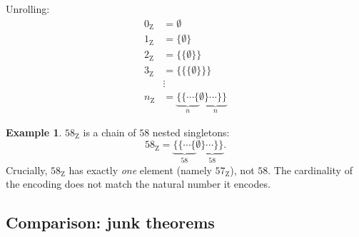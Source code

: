 \documentclass[12pt]{article}
\theoremstyle{definition}
\newtheorem{example}[theorem]{Example}
\theoremstyle{remark}
\begin{document}
Unrolling:
\begin{align*}
0_{\mathrm{Z}} &= \emptyset \\
1_{\mathrm{Z}} &= \{\emptyset\} \\
2_{\mathrm{Z}} &= \{\{\emptyset\}\} \\
3_{\mathrm{Z}} &= \{\{\{\emptyset\}\}\} \\
&\vdots \\
n_{\mathrm{Z}} &= \underbrace{\{\{\cdots\{}_{n}\emptyset\underbrace{\}\cdots\}\}}_{n}
\end{align*}

\begin{example}
$58_{\mathrm{Z}}$ is a chain of $58$ nested singletons:
\begin{equation}
58_{\mathrm{Z}} = \underbrace{\{\{\cdots\{}_{58}\emptyset\underbrace{\}\cdots\}\}}_{58}.
\end{equation}
Crucially, $58_{\mathrm{Z}}$ has exactly \emph{one} element (namely
$57_{\mathrm{Z}}$), not $58$. The cardinality of the encoding does not match
the natural number it encodes.
\end{example}

\subsection{Comparison: junk theorems}
\end{document}
